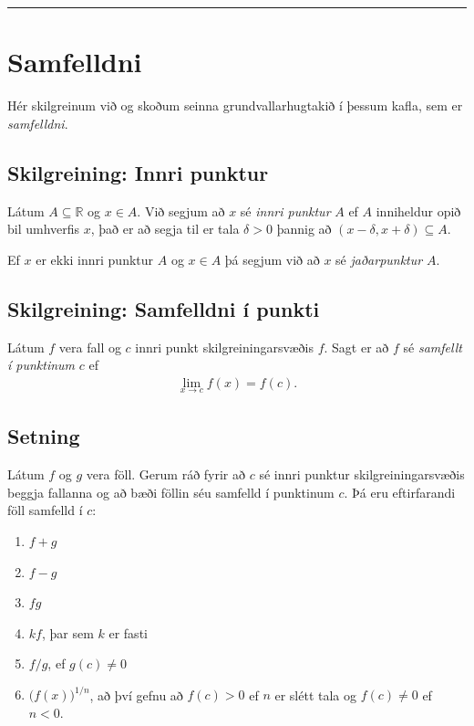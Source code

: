 \documentclass[a4paper,10pt,icelandic]{sphinxmanual}
\begin{document}

\bigskip\hrule{}\bigskip



\section{Samfelldni}
\label{kafli02:samfelldni}\label{kafli02:id11}
Hér skilgreinum við og skoðum seinna grundvallarhugtakið í þessum kafla, sem er \textit{samfelldni}.


\subsection{Skilgreining: Innri punktur}
\label{kafli02:skilgreining-innri-punktur}\label{kafli02:index-7}
Látum \(A\subseteq {{\mathbb  R}}\) og \(x\in A\). Við segjum að
\(x\) sé \textit{innri punktur} \(A\) ef \(A\) inniheldur opið bil
umhverfis \(x\), það er að segja til er tala \(\delta>0\) þannig
að \((x-\delta, x+\delta)\subseteq
A\).

Ef \(x\) er ekki innri punktur \(A\) og \(x\in A\) þá segjum
við að \(x\) sé \textit{jaðarpunktur} \(A\).


\subsection{Skilgreining: Samfelldni í punkti}
\label{kafli02:skilgreining-samfelldni-i-punkti}\label{kafli02:index-8}
Látum \(f\) vera fall og \(c\) innri punkt skilgreiningarsvæðis
\(f\). Sagt er að \(f\) sé \emph{samfellt í punktinum} \(c\) ef
\begin{equation*}
\begin{split}\lim_{x\rightarrow c}f(x)=f(c).\end{split}
\end{equation*}

\subsection{Setning}
\label{kafli02:id12}
Látum \(f\) og \(g\) vera föll. Gerum ráð fyrir að \(c\) sé
innri punktur skilgreiningarsvæðis beggja fallanna og að bæði föllin séu
samfelld í punktinum \(c\). Þá eru eftirfarandi föll samfelld í
\(c\):
\begin{enumerate}
\item {} 
\(f+g\)

\item {} 
\(f-g\)

\item {} 
\(fg\)

\item {} 
\(kf\), þar sem \(k\) er fasti

\item {} 
\(f/g\), ef \(g(c)\neq 0\)

\item {} 
\(\Big(f(x)\Big)^{1/n}\), að því gefnu að \(f(c)>0\) ef
\(n\) er slétt tala og \(f(c)\neq 0\) ef \(n<0\).

\end{enumerate}
\end{document}
